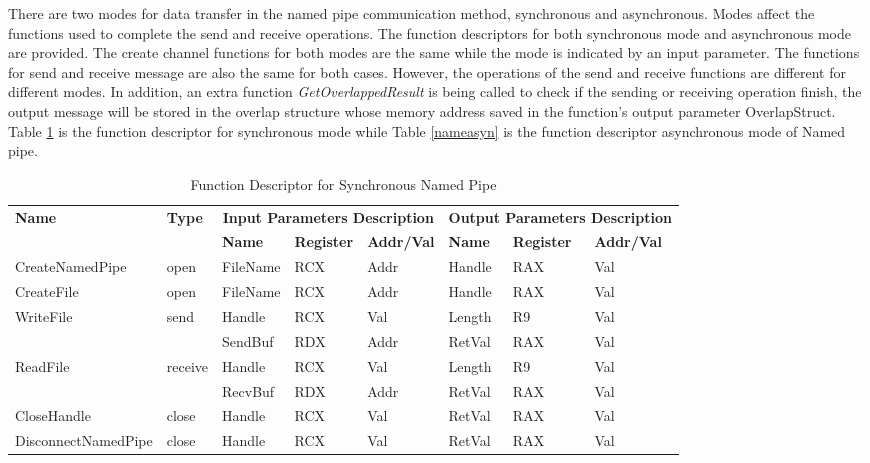 There are two modes for data transfer in the named pipe communication method, synchronous and asynchronous. Modes affect the functions used to complete the send and receive operations. The function descriptors for both synchronous mode and asynchronous mode are provided. The create channel functions for both modes are the same while the mode is indicated by an input parameter. The functions for send and receive message are also the same for both cases. However, the operations of the send and receive functions are different for different modes. In addition, an extra function \textit{GetOverlappedResult} is being called to check if the sending or receiving operation finish, the output message will be stored in the overlap structure whose memory address saved in the function's output parameter OverlapStruct. Table \ref{namesyn} is the function descriptor for synchronous mode while Table \ref{nameasyn} is the function descriptor asynchronous mode of Named pipe.

\begin{table}[H]
  \centering
  \caption{Function Descriptor for Synchronous Named Pipe}
  \label{namesyn}
  \begin{tabular}{|l|l|l|l|l|l|l|l|}
\hline
             \multirow{2}{*}{{\textbf{Name}}} & \multirow{2}{*}{{\textbf{Type}}} & \multicolumn{3}{c|}{\textbf{Input Parameters Description}} & \multicolumn{3}{c|}{\textbf{Output Parameters Description}} \\
              \cline{3-8} 
             & & \textbf{Name}& \textbf{Register} & \textbf{Addr/Val} & \textbf{Name}& \textbf{Register} &  \textbf{Addr/Val}  \\
             \hline
      CreateNamedPipe
       &open & FileName & RCX  & Addr &  Handle & RAX & Val\\
      \hline         
      CreateFile
       &open & FileName & RCX & Addr&  Handle & RAX & Val\\ 
      \hline              
      \multirow{2}{*}{WriteFile}
       &\multirow{2}{*}{send} &  Handle & RCX & Val & Length & R9 &Val\\
        \cline{3-8} 
       & & SendBuf & RDX & Addr & RetVal& RAX & Val\\
      \hline            
      \multirow{2}{*}{ReadFile}
       &\multirow{2}{*}{receive} &  Handle & RCX & Val& Length &R9 & Val\\
        \cline{3-8} 
       & & RecvBuf & RDX  & Addr & RetVal& RAX & Val\\
      \hline            
      CloseHandle &
       close &  Handle & RCX & Val & RetVal& RAX & Val\\
      \hline            
      DisconnectNamedPipe &
      close &  Handle & RCX & Val & RetVal& RAX & Val\\
      \hline               
  \end{tabular}
\end{table}

